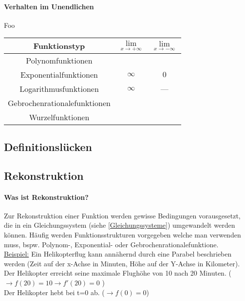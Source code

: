 \documentclass{article}
\begin{document}
		\paragraph{Verhalten im Unendlichen}\label{Verhalten Im unendlichen}
			Foo\\
		
				\begin{tabular}{|c|c|c|}
			\hline 
			Funktionstyp & $\lim\limits_{x \rightarrow + \infty}$& $\lim\limits_{x \rightarrow - \infty}$ \\
			\hline
			Polynomfunktionen & & \\
			\hline
			Exponentialfunktionen & $\infty$ & $0$ \\
			\hline
			Logarithmusfunktionen & $\infty$ & --- \\
			\hline
			Gebrochenrationalefunktionen & & \\
			\hline
			Wurzelfunktionen & & \\ 
			\hline
		\end{tabular}
		
	\subsection{Definitionslücken}\label{Definitionslücke}
	
	\subsection{Rekonstruktion}\label{Rekonstruktion}
		\paragraph{Was ist Rekonstruktion?}
			Zur Rekonstruktion einer Funktion werden gewisse Bedingungen vorausgesetzt, die in ein Gleichungssystem (siehe \ref{Gleichungssysteme}) umgewandelt werden können. Häufig werden Funktionsstrukturen vorgegeben welche man verwenden muss, bspw. Polynom-, Exponential- oder Gebrochenrationalefunktione. \\
			\underline{Beispiel:} Ein Helikopterflug kann annähernd durch eine Parabel beschrieben werden (Zeit auf der x-Achse in Minuten, Höhe auf der Y-Achse in Kilometer). \\
			Der Helikopter erreicht seine maximale Flughöhe von 10 nach 20 Minuten. ( $ \rightarrow f(20)=10 \rightarrow f'(20)=0 $ ) \\
			Der Helikopter hebt bei t=0 ab. ($ \rightarrow f(0)=0$) \\
			
\end{document}
